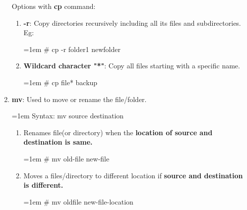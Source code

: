 \begin{flushleft}
\begin{enumerate}
		Options with \textbf{cp} command:
		\begin{enumerate}[label=(\alph*)]
				\item \textbf{-r}: Copy directories recursively including all its files and subdirectories.
				\newline
				Eg:
				\begin{tcolorbox}[breakable,notitle,boxrule=-0pt,colback=black,colframe=black]
					\color{green}
					\font=1em
					\# cp -r folder1  newfolder
					\font=4pt
			\end{tcolorbox}
			\item \textbf{Wildcard character "*"}: Copy all files starting with a specific name.
			\bigskip
			\begin{tcolorbox}[breakable,notitle,boxrule=-0pt,colback=black,colframe=black]
				\color{green}
				\fontdimen2\font=1em
				\# cp file* backup
				\fontdimen2\font=4pt
			\end{tcolorbox}
		\end{enumerate}
		\bigskip
		\bigskip		

		
		\item \textbf{mv}: Used to move or rename the file/folder.
		\bigskip
		\begin{tcolorbox}[breakable,notitle,boxrule=1pt,colback=pink,colframe=pink]
			\color{black}
			\font=1em
			Syntax:  mv source destination
			\font=4pt
		\end{tcolorbox}
		\begin{enumerate}[label=(\alph*)]
		\item Renames file(or directory) when the \textbf{location of source and destination is same.}
		\bigskip
		\begin{tcolorbox}[breakable,notitle,boxrule=1pt,colback=black,colframe=black]
			\color{green}
			\font=1em
			\# mv old-file new-file
			\font=4pt
		\end{tcolorbox}
		\item Moves a files/directory to different location if \textbf{source and destination is different.}
		\bigskip
		\begin{tcolorbox}[breakable,notitle,boxrule=-0pt,colback=black,colframe=black]
			\color{green}
			\font=1em
			\# mv oldfile new-file-location
			\font=4pt
		\end{tcolorbox}
		\end{enumerate}
		\bigskip
		\bigskip
	

\end{enumerate}
\end{flushleft}
